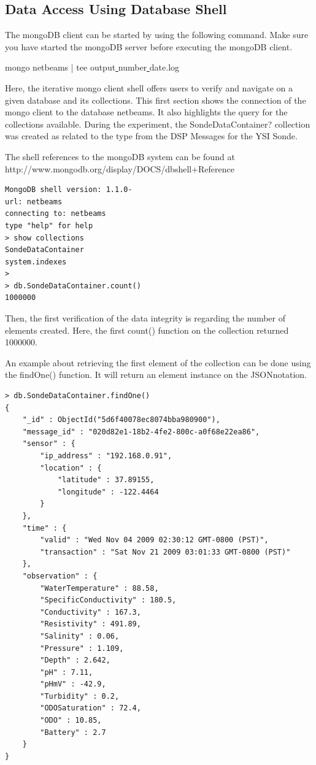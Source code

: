 \subsection{Data Access Using Database Shell}
\label{sec:mongodb-user-experience}

The mongoDB client can be started by using the following command. Make sure you
have started the mongoDB server before executing the mongoDB client.

mongo netbeams | tee output\underline{ }number\underline{ }date.log

Here, the iterative mongo client shell offers users to verify and navigate on a
given database and its collections. This first section shows the connection of
the mongo client to the database netbeams. It also highlights the query for the
collections available. During the experiment, the SondeDataContainer?
collection was created as related to the type from the DSP Messages for the YSI
Sonde.

The shell references to the mongoDB system can be found at
http://www.mongodb.org/display/DOCS/dbshell+Reference 

\lstset{label=cmd:mongo,caption=Execution of mongo client}
\begin{lstlisting}
MongoDB shell version: 1.1.0-
url: netbeams
connecting to: netbeams
type "help" for help
> show collections
SondeDataContainer
system.indexes
>
> db.SondeDataContainer.count()
1000000
\end{lstlisting}

Then, the first verification of the data integrity is regarding the number of
elements created. Here, the first count() function on the collection returned
1000000.

An example about retrieving the first element of the collection can be done
using the findOne() function. It will return an element instance on the
JSONnotation.

\lstset{label=cmd:mongo-findone,caption=Querying the database: one item}
\begin{lstlisting}
> db.SondeDataContainer.findOne()
{
    "_id" : ObjectId("5d6f40078ec8074bba980900"),
    "message_id" : "020d82e1-18b2-4fe2-800c-a0f68e22ea86",
    "sensor" : {
        "ip_address" : "192.168.0.91",
        "location" : {
            "latitude" : 37.89155,
            "longitude" : -122.4464
        }
    },
    "time" : {
        "valid" : "Wed Nov 04 2009 02:30:12 GMT-0800 (PST)",
        "transaction" : "Sat Nov 21 2009 03:01:33 GMT-0800 (PST)"
    },
    "observation" : {
        "WaterTemperature" : 88.58,
        "SpecificConductivity" : 180.5,
        "Conductivity" : 167.3,
        "Resistivity" : 491.89,
        "Salinity" : 0.06,
        "Pressure" : 1.109,
        "Depth" : 2.642,
        "pH" : 7.11,
        "pHmV" : -42.9,
        "Turbidity" : 0.2,
        "ODOSaturation" : 72.4,
        "ODO" : 10.85,
        "Battery" : 2.7
    }
}
\end{lstlisting}

